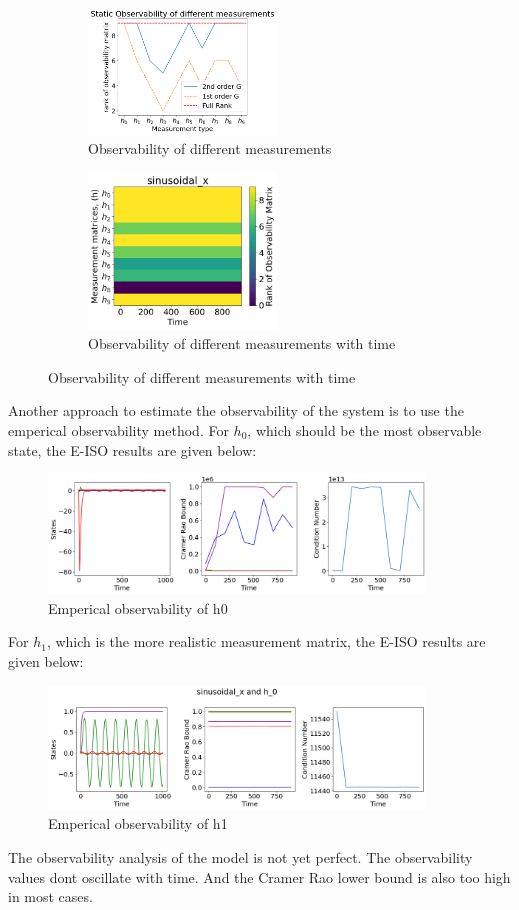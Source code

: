 \documentclass[12pt]{article}
\begin{document}
\begin{figure}[h!]
    \begin{subfigure}[t]{0.5\textwidth}
        \centering
        \includegraphics[width=5cm]{figures/phase_03_obswithh.png}
        \caption{Observability of different measurements}
        \label{fig:05}
    \end{subfigure}
    \hfill
    \begin{subfigure}[t]{0.5\textwidth}
        \centering
        \includegraphics[width=5cm]{figures/phase_03_obswithtime.png}
        \caption{Observability of different measurements with time}
        \label{fig:06}
    \end{subfigure}
\end{figure}
Another approach to estimate the observability of the system is to use the emperical observability method. For $h_0$, which should be the most observable state, the E-ISO results are given below:
\begin{figure}[h!]
    \centering
    \includegraphics[width=10cm]{figures/phase_03_emperical1.png}
    \caption{Emperical observability of h0}
    \label{fig:07}
\end{figure}
For $h_1$, which is the more realistic measurement matrix, the E-ISO results are given below:
\begin{figure}[h!]
    \centering
    \includegraphics[width=10cm]{figures/phase_03_emperical2.png}
    \caption{Emperical observability of h1}
    \label{fig:08}
\end{figure}
The observability analysis of the model is not yet perfect. The observability values dont oscillate with time. And the Cramer Rao lower bound is also too high in most cases. 
\end{document}
